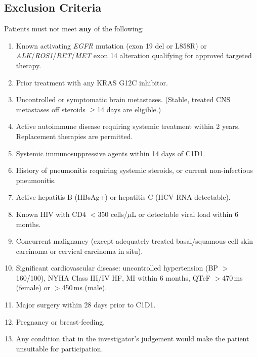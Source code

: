 \subsection{Exclusion Criteria}

Patients must not meet \textbf{any} of the following:

\begin{enumerate}
  \item Known activating \textit{EGFR} mutation (exon 19 del or L858R) or \textit{ALK}/\textit{ROS1}/\textit{RET}/\textit{MET} exon 14 alteration qualifying for approved targeted therapy.
  \item Prior treatment with any KRAS G12C inhibitor.
  \item Uncontrolled or symptomatic brain metastases. (Stable, treated CNS metastases off steroids $\geq$14 days are eligible.)
  \item Active autoimmune disease requiring systemic treatment within 2 years. Replacement therapies are permitted.
  \item Systemic immunosuppressive agents within 14 days of C1D1.
  \item History of pneumonitis requiring systemic steroids, or current non-infectious pneumonitis.
  \item Active hepatitis B (HBsAg+) or hepatitis C (HCV RNA detectable).
  \item Known HIV with CD4 $<$350 cells/$\mu$L or detectable viral load within 6 months.
  \item Concurrent malignancy (except adequately treated basal/squamous cell skin carcinoma or cervical carcinoma in situ).
  \item Significant cardiovascular disease: uncontrolled hypertension (BP $>$160/100), NYHA Class III/IV HF, MI within 6 months, QTcF $>$470\,ms (female) or $>$450\,ms (male).
  \item Major surgery within 28 days prior to C1D1.
  \item Pregnancy or breast-feeding.
  \item Any condition that in the investigator's judgement would make the patient unsuitable for participation.
\end{enumerate}

